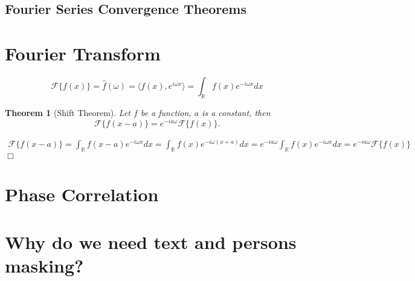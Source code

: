 \documentclass[9pt]{article}
\newtheorem{theorem}{Theorem}[section]
\newtheorem{proof}{Proof}
\renewenvironment{proof}{{\bf \emph{Proof.} }}{\hfill $\Box$ \\}
\numberwithin{equation}{section}
\begin{document}
\subsection{Fourier Series Convergence Theorems}\label{subsec:fourier-series-convergence}

\section{Fourier Transform}\label{sec:fourier-transform}

\[
    \mathcal F \{ f(x) \}  = \hat f (\omega) = \langle f(x), e^{i \omega x} \rangle =
    \int_{\mathbb R} f(x) e^{-i \omega x} dx
\]

\begin{theorem}[Shift Theorem] \label{shift_theorem}
    Let \(f\) be a function, $a$ is a constant, then
    \[
        \mathcal F \{ f(x - a) \} =  e^{-i a \omega} \mathcal F \{ f(x) \}.
    \]
\end{theorem}

\begin{proof}
    \begin{multline}
        \mathcal F \{ f(x - a) \}  =  \int_{\mathbb R} f(x - a) e^{-i \omega x} dx =
        \int_{\mathbb R} f(x) e^{-i \omega (x + a)} dx = \allowbreak
        e^{-i a \omega} \int_{\mathbb R} f(x) e^{-i \omega x} dx = e^{-i a \omega} \mathcal F \{ f(x) \}
    \end{multline}
\end{proof}

\section{Phase Correlation}\label{sec:theory-behind-phase-correlation}

\section{Why do we need text and persons masking?}\label{sec:why-we-need-text-and-persond-masking?}
\end{document}
